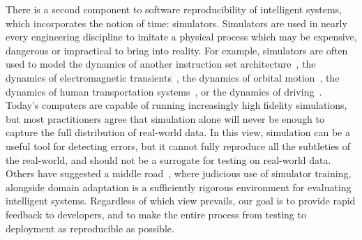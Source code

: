 \documentclass[12pt,initial,twoside,maitrise]{dms}
\numberwithin{equation}{section}
\numberwithin{table}{chapter}
\numberwithin{figure}{chapter}
\begin{document}
There is a second component to software reproducibility of intelligent systems, which incorporates the notion of time: simulators. Simulators are used in nearly every engineering discipline to imitate a physical process which may be expensive, dangerous or impractical to bring into reality. For example, simulators are often used to model the dynamics of another instruction set architecture~\citep{bellard2005qemu}, the dynamics of electromagnetic transients~\citep{tavante2018opensi}, the dynamics of orbital motion~\citep{bellman1965wengert}, the dynamics of human transportation systems~\citep{ruch2018amodeus}, or the dynamics of driving~\citep{gym_duckietown}. Today's computers are capable of running increasingly high fidelity simulations, but most practitioners agree that simulation alone will never be enough to capture the full distribution of real-world data. In this view, simulation can be a useful tool for detecting errors, but it cannot fully reproduce all the subtleties of the real-world, and should not be a surrogate for testing on real-world data. Others have suggested a middle road~\citep{bousmalis2018using}, where judicious use of simulator training, alongside domain adaptation is a sufficiently rigorous environment for evaluating intelligent systems. Regardless of which view prevails, our goal is to provide rapid feedback to developers, and to make the entire process from testing to deployment as reproducible as possible.

%
\end{document}
